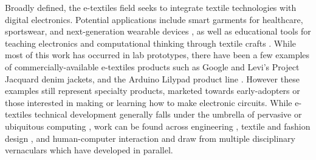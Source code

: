  Broadly defined, the e-textiles field seeks to integrate textile technologies with digital electronics.  Potential applications include smart garments for healthcare, sportswear, and
next-generation wearable devices \cite{stoppa_wearable_2014},
as well as educational tools for teaching electronics and computational thinking through textile crafts \cite{kafai_ethnocomputing_2014, buechley_lilypad-edu_2008}. 
While most of this work has occurred in lab prototypes, there have been a few examples of commercially-available e-textiles products such as Google and Levi's Project Jacquard denim jackets, and the Arduino Lilypad product line \cite{poupyrev_project_2016, buechley_lilypad_2008}. However these examples still represent specialty products, marketed towards early-adopters or those interested in making or learning how to make electronic circuits.
While e-textiles technical development generally falls under the umbrella of pervasive or ubiquitous computing \cite{marculescu_electronic_2003}, work can be found across engineering \cite{liu_advances_2018, afroj_engineering_2019, lund_roll--roll_2018} %
, textile and fashion design \cite{mcquillan_hybrid_2019, fairburn_spheres_2016} %
, and human-computer interaction \cite{nachtigall_five-year_2018, posch_etextiles_2019} %
and draw from multiple disciplinary vernaculars which have developed in parallel. 

